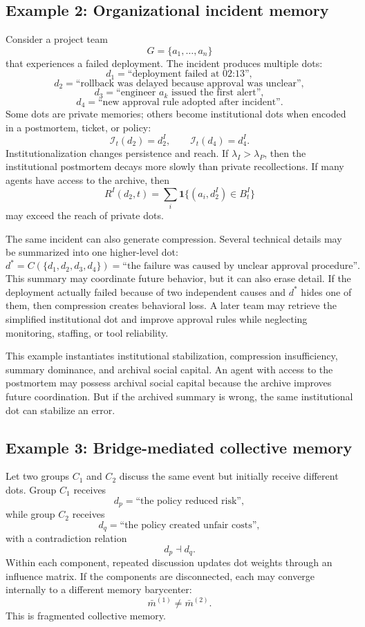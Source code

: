 \documentclass[11pt]{article}
\theoremstyle{remark}
\begin{document}
\subsection{Example 2: Organizational incident memory}\label{example-organizational-incident-memory}

Consider a project team
\[
G=\{a_1,\ldots,a_n\}
\]
that experiences a failed deployment. The incident produces multiple dots:
\[
d_1=\text{``deployment failed at 02:13''},
\]
\[
d_2=\text{``rollback was delayed because approval was unclear''},
\]
\[
d_3=\text{``engineer }a_k\text{ issued the first alert''},
\]
\[
d_4=\text{``new approval rule adopted after incident''}.
\]
Some dots are private memories; others become institutional dots when encoded in a postmortem, ticket, or policy:
\[
\mathcal I_t(d_2)=d_2^I,\qquad \mathcal I_t(d_4)=d_4^I.
\]
Institutionalization changes persistence and reach. If $\lambda_I>\lambda_P$, then the institutional postmortem decays more slowly than private recollections. If many agents have access to the archive, then
\[
R^I(d_2,t)=\sum_i \mathbf 1\{(a_i,d_2^I)\in B_t^I\}
\]
may exceed the reach of private dots.

The same incident can also generate compression. Several technical details may be summarized into one higher-level dot:
\[
d^*=C(\{d_1,d_2,d_3,d_4\})=\text{``the failure was caused by unclear approval procedure''}.
\]
This summary may coordinate future behavior, but it can also erase detail. If the deployment actually failed because of two independent causes and $d^*$ hides one of them, then compression creates behavioral loss. A later team may retrieve the simplified institutional dot and improve approval rules while neglecting monitoring, staffing, or tool reliability.

This example instantiates institutional stabilization, compression insufficiency, summary dominance, and archival social capital. An agent with access to the postmortem may possess archival social capital because the archive improves future coordination. But if the archived summary is wrong, the same institutional dot can stabilize an error.

\subsection{Example 3: Bridge-mediated collective memory}\label{example-bridge-collective-memory}

Let two groups $C_1$ and $C_2$ discuss the same event but initially receive different dots. Group $C_1$ receives
\[
d_p=\text{``the policy reduced risk''},
\]
while group $C_2$ receives
\[
d_q=\text{``the policy created unfair costs''},
\]
with a contradiction relation
\[
d_p\dashv d_q.
\]
Within each component, repeated discussion updates dot weights through an influence matrix. If the components are disconnected, each may converge internally to a different memory barycenter:
\[
\bar m^{(1)}\neq \bar m^{(2)}.
\]
This is fragmented collective memory.
\end{document}
